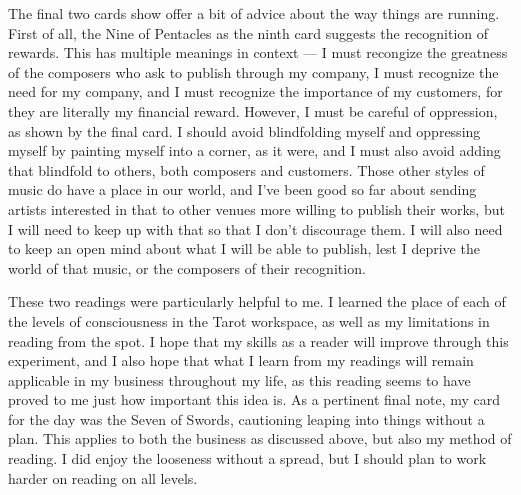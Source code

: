 The final two cards show offer a bit of advice about the way things are
running.  First of all, the Nine of Pentacles as the ninth card suggests
the recognition of rewards.  This has multiple meanings in context --- I
must recongize the greatness of the composers who ask to publish through
my company, I must recognize the need for my company, and I must
recognize the importance of my customers, for they are literally my
financial reward.  However, I must be careful of oppression, as shown by
the final card.  I should avoid blindfolding myself and oppressing
myself by painting myself into a corner, as it were, and I must also
avoid adding that blindfold to others, both composers and customers.
Those other styles of music do have a place in our world, and I've been
good so far about sending artists interested in that to other venues
more willing to publish their works, but I will need to keep up with
that so that I don't discourage them.  I will also need to keep an open
mind about what I will be able to publish, lest I deprive the world of
that music, or the composers of their recognition.

These two readings were particularly helpful to me.  I learned the place
of each of the levels of consciousness in the Tarot workspace, as well
as my limitations in reading from the spot.  I hope that my skills as a
reader will improve through this experiment, and I also hope that what I
learn from my readings will remain applicable in my business throughout
my life, as this reading seems to have proved to me just how important
this idea is.  As a pertinent final note, my card for the day was the
Seven of Swords, cautioning leaping into things without a plan.  This
applies to both the business as discussed above, but also my method of
reading.  I did enjoy the looseness without a spread, but I should plan
to work harder on reading on all levels.

